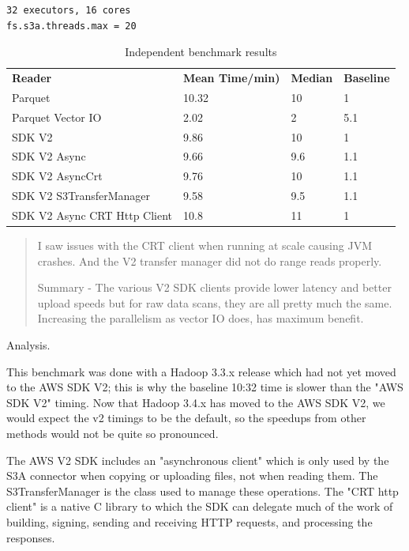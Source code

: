 \documentclass[manuscript]{acmart}
\begin{document}
\begin{verbatim}
32 executors, 16 cores
fs.s3a.threads.max = 20
\end{verbatim}

\begin{table}
  \begin{tabular}{ l l l l }
    \hline
    \textbf{Reader} & \textbf{Mean Time/min)} & \textbf{Median} & \textbf{Baseline}\\
    Parquet	& 10.32	& 10 & 1 \\
    Parquet Vector IO	& 2.02 & 2	& 5.1 \\
    SDK V2 & 9.86 & 10 & 1 \\
    SDK V2 Async & 9.66	& 9.6 & 1.1 \\
    SDK V2 AsyncCrt	& 9.76 & 10 & 1.1 \\
    SDK V2 S3TransferManager & 9.58 & 9.5 & 1.1 \\
    SDK V2 Async CRT Http Client & 10.8 & 11 & 1 \\
    \hline
  \end{tabular}
\caption{Independent benchmark results}
\label{tab:independent-benchmark-results}
\end{table}

\begin{quotation}

I saw issues with the CRT client when running at scale causing JVM crashes.
And the V2 transfer manager did not do range reads properly.

Summary - The various V2 SDK clients provide lower latency and better upload speeds but for raw data scans,
they are all pretty much the same.
Increasing the parallelism as vector IO does, has maximum benefit.
\end{quotation}

Analysis.

This benchmark was done with a Hadoop 3.3.x release which had not yet moved to
the AWS SDK V2; this is why the baseline 10:32 time is slower than the "AWS SDK V2"
timing.
Now that Hadoop 3.4.x has moved to the AWS SDK V2, we would expect the v2 timings to
be the default, so the speedups from other methods would not be quite so pronounced.

The AWS V2 SDK includes an "asynchronous client" which is only used by the S3A
connector when copying or uploading files, not when reading them.
The S3TransferManager is the class used to manage these operations.
The "CRT http client" is a native C library to which the SDK can delegate much
of the work of building, signing, sending and receiving HTTP requests, and processing
the responses.
\end{document}
